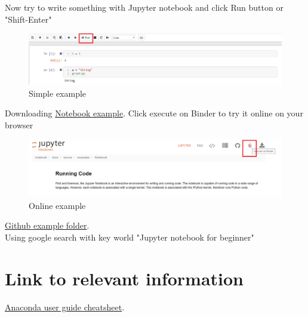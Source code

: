 \documentclass[a4paper,10pt]{article}
\begin{document}
\vspace{1cm}

Now try to write something with Jupyter notebook and click Run button or "Shift-Enter"

\begin{figure}[H]
\centering\includegraphics[width=1\columnwidth]{Pictures/Jupyter_try.png}
\caption[Short title]{Simple example}
\label{fig:ff9}\end{figure}

\vspace{1cm}

Downloading \href{https://nbviewer.jupyter.org/github/jupyter/notebook/blob/master/docs/source/examples/Notebook/Running\%20Code.ipynb#}{Notebook example}. Click execute on Binder to try it online on your browser


\begin{figure}[H]
\centering\includegraphics[width=1\columnwidth]{Pictures/Jupyter_online_try.png}
\caption[Short title]{Online example}
\label{fig:ff10}\end{figure}

\vspace{1cm}

\href{https://github.com/jupyter/notebook/blob/master/docs/source/examples/Notebook/Running\%20Code.ipynb}{Github example folder}.\\
Using google search with key world "Jupyter notebook for beginner"


\section{Link to relevant information}

\hspace{3ex}\href{https://docs.anaconda.com/anaconda/user-guide/cheatsheet/}{Anaconda user guide cheatsheet}.
\end{document}

